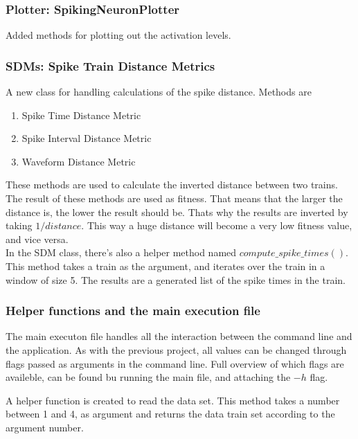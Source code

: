 \subsubsection{Plotter: SpikingNeuronPlotter}
Added methods for plotting out the activation levels. 


\subsubsection{SDMs: Spike Train Distance Metrics}
\label{sec:sdm}
A new class for handling calculations of the spike distance. Methods are 

\begin{enumerate}
	\item Spike Time Distance Metric
	\item Spike Interval Distance Metric
	\item Waveform Distance Metric
\end{enumerate}

These methods are used to calculate the inverted distance between two trains. The result of these
methods are used as fitness. That means that the larger the distance is, the lower the result should be.
Thats why the results are inverted by taking $1/distance$. This way a huge distance will become a very
low fitness value, and vice versa.  \\

In the SDM class, there's also a helper method named $compute\_spike\_times()$. This method
takes a train as the argument, and iterates over the train in a window of size 5. The results
are a generated list of the spike times in the train. 

\subsubsection{Helper functions and the main execution file}

The main executon file handles all the interaction between the command line and the application. As
with the previous project, all values can be changed through flags passed as arguments in the command
line. Full overview of which flags are availeble, can be found bu running the main file, and attaching the $-h$ flag. 

A helper function is created to read the data set. This method takes a number between 1 and 4, as argument and 
returns the data train set according to the argument number. \\


